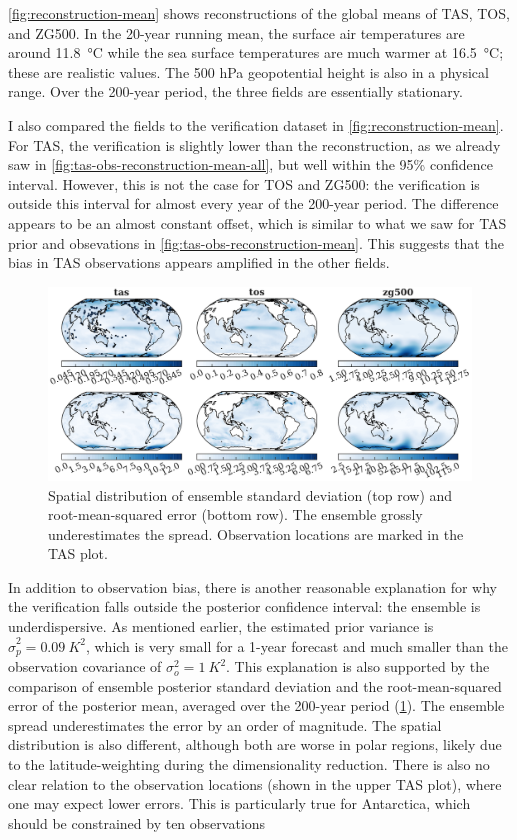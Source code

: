\documentclass[parskip=half,DIV=16]{scrartcl}
\begin{document}
\cref{fig:reconstruction-mean} shows reconstructions of the global means of TAS, TOS, and ZG500. In the 20-year running mean, the surface air temperatures are around \qty{11.8}{\celsius} while the sea surface temperatures are much warmer at \qty{16.5}{\celsius}; these are realistic values. The 500 hPa geopotential height is also in a physical range. Over the 200-year period, the three fields are essentially stationary.

I also compared the fields to the verification dataset in \cref{fig:reconstruction-mean}. For TAS, the verification is slightly lower than the reconstruction, as we already saw in \cref{fig:tas-obs-reconstruction-mean-all}, but well within the 95\% confidence interval. However, this is not the case for TOS and ZG500: the verification is outside this interval for almost every year of the 200-year period. The difference appears to be an almost constant offset, which is similar to what we saw for TAS prior and obsevations in \cref{fig:tas-obs-reconstruction-mean}. This suggests that the bias in TAS observations appears amplified in the other fields.


\begin{figure}[h]
    \centering
    \includegraphics{figures/plots/var_vs_sqerr.pdf}
    \caption{Spatial distribution of ensemble standard deviation (top row) and root-mean-squared error (bottom row). The ensemble grossly underestimates the spread. Observation locations are marked in the TAS plot.}
    \label{fig:var-vs-sqerr}
\end{figure}

In addition to observation bias, there is another reasonable explanation for why the verification falls outside the posterior confidence interval: the ensemble is underdispersive. As mentioned earlier, the estimated prior variance is $\hat\sigma_p^2 = \qty{0.09}{K^2}$, which is very small for a 1-year forecast and much smaller than the observation covariance of $\sigma_o^2 = \qty{1}{K^2}$. This explanation is also supported by the comparison of ensemble posterior standard deviation and the root-mean-squared error of the posterior mean, averaged over the 200-year period (\cref{fig:var-vs-sqerr}). The ensemble spread underestimates the error by an order of magnitude. The spatial distribution is also different, although both are worse in polar regions, likely due to the latitude-weighting during the dimensionality reduction. There is also no clear relation to the observation locations (shown in the upper TAS plot), where one may expect lower errors. This is particularly true for Antarctica, which should be constrained by ten observations
\end{document}
